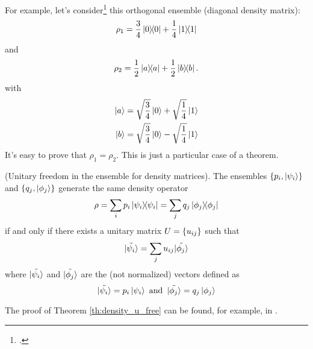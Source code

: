 For example, let's consider\footcite[\emph{Exercise 2.71: (Criterion to decide if a state is mixed or pure)}]{NielsenChuang}
this orthogonal ensemble (diagonal density matrix):
\[
  \rho_1 = \frac{3}{4}\ketbra{0}{0} + \frac{1}{4}\ketbra{1}{1}
\]
and
\[
  \rho_2 = \frac{1}{2}\ketbra{a}{a} + \frac{1}{2}\ketbra{b}{b}\text{.}
\]
with
\begin{align*}
  \ket{a} &= \sqrt{\frac{3}{4}}\ket{0} + \sqrt{\frac{1}{4}}\ket{1} \\
  \ket{b} &= \sqrt{\frac{3}{4}}\ket{0} - \sqrt{\frac{1}{4}}\ket{1}
\end{align*}
It's easy to prove that $\rho_1 = \rho_2$. This is just a particular
case of a theorem.
\begin{theorem}{(Unitary freedom in the ensemble for density matrices).}\label{th:density_u_free}
  The ensembles
  $\left\{p_i, \ket{\psi_i}\right\}$ and $\left\{q_{j}, \ket{\phi_j}\right\}$
  generate the same density operator
  $$\rho = \sum_i p_i \ketbra{\psi_i} = \sum_j q_j \ketbra{\phi_j}$$
  if and only if there exists
  a unitary matrix %
  $U = \left\{u_{ij}\right\}$ such that
  \[
    \tilde{\ket{\psi_i}} = \sum_j u_{ij}\tilde{\ket{\phi_j}}
  \]
  where $\tilde{\ket{\psi_i}}$ and $\tilde{\ket{\phi_j}}$
  are the (not normalized) vectors defined as
  \[
    \tilde{\ket{\psi_i}} = p_{i}\ket{\psi_i}
    \text{ and }\,
    \tilde{\ket{\phi_j}} = q_{j}\ket{\phi_j}
  \]
\end{theorem}
The proof of Theorem \ref{th:density_u_free} can be found, for example,
in \cite[theorem 2.6]{NielsenChuang}.
